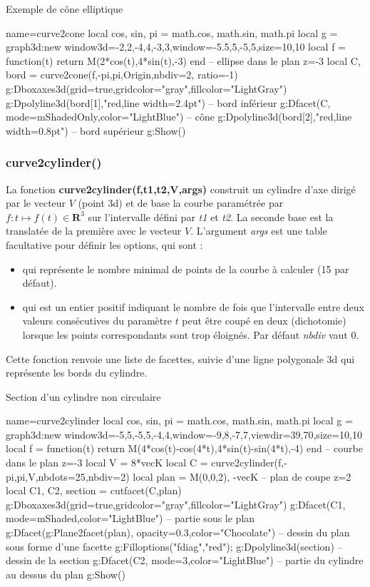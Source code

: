 \begin{demo}{Exemple de cône elliptique}
\begin{luadraw}{name=curve2cone}
local cos, sin, pi = math.cos, math.sin, math.pi
local g = graph3d:new{ window3d={-2,2,-4,4,-3,3},window={-5.5,5,-5,5},size={10,10}}
local f = function(t) return M(2*cos(t),4*sin(t),-3) end -- ellipse dans le plan z=-3
local C, bord = curve2cone(f,-pi,pi,Origin,{nbdiv=2, ratio=-1})
g:Dboxaxes3d({grid=true,gridcolor="gray",fillcolor="LightGray"})
g:Dpolyline3d(bord[1],"red,line width=2.4pt") -- bord inférieur
g:Dfacet(C, {mode=mShadedOnly,color="LightBlue"})  -- cône
g:Dpolyline3d(bord[2],"red,line width=0.8pt") -- bord supérieur
g:Show()
\end{luadraw}
\end{demo}

\subsubsection{curve2cylinder()}
La fonction \textbf{curve2cylinder(f,t1,t2,V,args)} construit un cylindre d'axe dirigé par le vecteur $V$ (point 3d) et de base la courbe paramétrée par $f\colon t\mapsto f(t)\in\mathbf R^3$ sur l'intervalle défini par \emph{t1} et \emph{t2}. La seconde base est la translatée de la première avec le vecteur $V$. L'argument \emph{args} est une table facultative pour définir les options, qui sont :
    \begin{itemize}
        \item {} qui représente le nombre minimal de points de la courbe à calculer (15 par défaut).
        \item {} qui est un entier positif indiquant le nombre de fois que l'intervalle entre deux valeurs consécutives du paramètre $t$ peut être coupé en deux (dichotomie) lorsque les points correspondants sont trop éloignés. Par défaut \emph{nbdiv} vaut 0.
    \end{itemize}
 Cette fonction renvoie une liste de facettes, suivie d'une ligne polygonale 3d qui représente les bords du cylindre.
 
\begin{demo}{Section d'un cylindre non circulaire}
\begin{luadraw}{name=curve2cylinder}
local cos, sin, pi = math.cos, math.sin, math.pi
local g = graph3d:new{ window3d={-5,5,-5,5,-4,4},window={-9,8,-7,7},viewdir={39,70},size={10,10}}
local f = function(t) return M(4*cos(t)-cos(4*t),4*sin(t)-sin(4*t),-4) end -- courbe dans le plan z=-3
local V = 8*vecK
local C = curve2cylinder(f,-pi,pi,V,{nbdots=25,nbdiv=2})
local plan = {M(0,0,2), -vecK} -- plan de coupe z=2
local C1, C2, section = cutfacet(C,plan)
g:Dboxaxes3d({grid=true,gridcolor="gray",fillcolor="LightGray"})
g:Dfacet(C1, {mode=mShaded,color="LightBlue"})  -- partie sous le plan
g:Dfacet(g:Plane2facet(plan), {opacity=0.3,color="Chocolate"}) -- dessin du plan sous forme d'une facette
g:Filloptions("fdiag","red"); g:Dpolyline3d(section) -- dessin de la section
g:Dfacet(C2, {mode=3,color="LightBlue"})  -- partie du cylindre au dessus du plan
g:Show()
\end{luadraw}
\end{demo}

